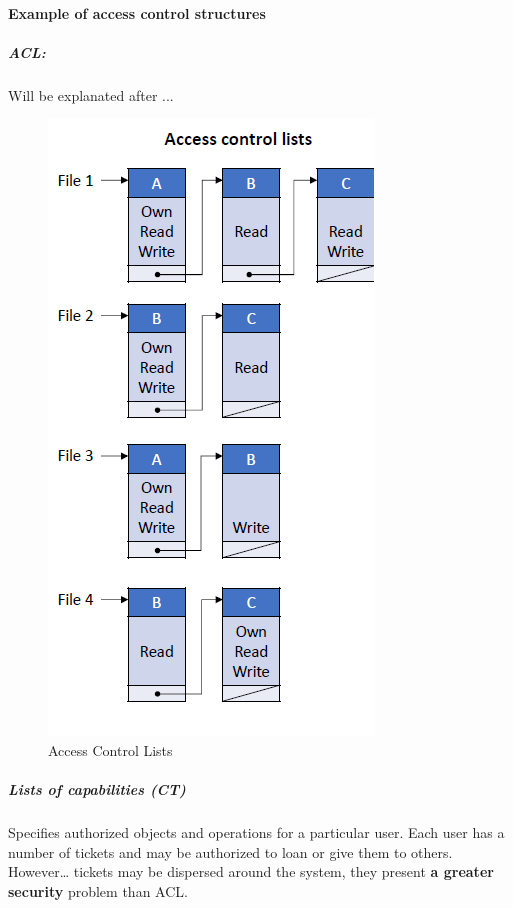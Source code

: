\documentclass{article}
\begin{document}
                    \paragraph{Example of access control structures}
                        \subparagraph{ACL:} Will be explanated after ...
                            \begin{figure}[h]
                                \begin{center}
                                    \includegraphics[scale=0.5]{../immagini/acl.png}
                                \end{center}
                                \caption{Access Control Lists}
                            \end{figure}
                            \vspace{2cm}
                        \subparagraph{Lists of capabilities (CT)}
                        Specifies authorized objects and operations for a
                        particular user. Each user has a number of tickets and may be
                        authorized to loan or give them to others. However… tickets may be dispersed around the
                        system, they present \textbf{a greater security} problem
                        than ACL.
\end{document}
